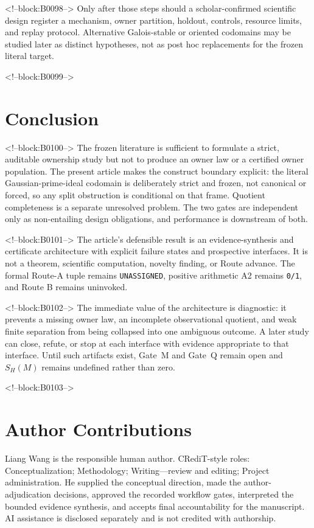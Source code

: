 \documentclass[11pt,a4paper]{article}
\begin{document}
<!--block:B0098-->
Only after those steps should a scholar-confirmed scientific design register a mechanism, owner partition, holdout, controls, resource limits, and replay protocol. Alternative Galois-stable or oriented codomains may be studied later as distinct hypotheses, not as post hoc replacements for the frozen literal target.

<!--block:B0099-->
\section{Conclusion}

<!--block:B0100-->
The frozen literature is sufficient to formulate a strict, auditable ownership study but not to produce an owner law or a certified owner population. The present article makes the construct boundary explicit: the literal Gaussian-prime-ideal codomain is deliberately strict and frozen, not canonical or forced, so any split obstruction is conditional on that frame. Quotient completeness is a separate unresolved problem. The two gates are independent only as non-entailing design obligations, and performance is downstream of both.

<!--block:B0101-->
The article's defensible result is an evidence-synthesis and certificate architecture with explicit failure states and prospective interfaces. It is not a theorem, scientific computation, novelty finding, or Route advance. The formal Route-A tuple remains \texttt{UNASSIGNED}, positive arithmetic A2 remains \texttt{0/1}, and Route B remains uninvoked.

<!--block:B0102-->
The immediate value of the architecture is diagnostic: it prevents a missing owner law, an incomplete observational quotient, and weak finite separation from being collapsed into one ambiguous outcome. A later study can close, refute, or stop at each interface with evidence appropriate to that interface. Until such artifacts exist, Gate~M and Gate~Q remain open and \(S_H(M)\) remains undefined rather than zero.

<!--block:B0103-->
\section*{Author Contributions}
Liang Wang is the responsible human author. CRediT-style roles: Conceptualization; Methodology; Writing---review and editing; Project administration. He supplied the conceptual direction, made the author-adjudication decisions, approved the recorded workflow gates, interpreted the bounded evidence synthesis, and accepts final accountability for the manuscript. AI assistance is disclosed separately and is not credited with authorship.
\end{document}
